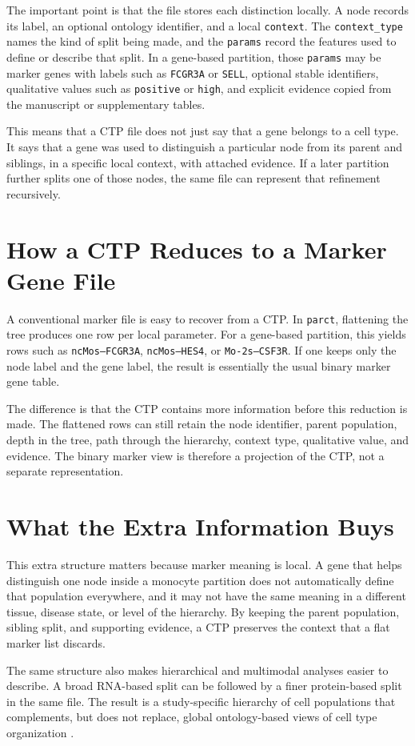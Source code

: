 \documentclass{article}
\begin{document}
The important point is that the file stores each distinction locally. A node records its label, an optional ontology identifier, and a local \texttt{context}. The \texttt{context\_type} names the kind of split being made, and the \texttt{params} record the features used to define or describe that split. In a gene-based partition, those \texttt{params} may be marker genes with labels such as \texttt{FCGR3A} or \texttt{SELL}, optional stable identifiers, qualitative values such as \texttt{positive} or \texttt{high}, and explicit evidence copied from the manuscript or supplementary tables.

This means that a CTP file does not just say that a gene belongs to a cell type. It says that a gene was used to distinguish a particular node from its parent and siblings, in a specific local context, with attached evidence. If a later partition further splits one of those nodes, the same file can represent that refinement recursively.

\section{How a CTP Reduces to a Marker Gene File}
A conventional marker file is easy to recover from a CTP. In \texttt{parct}, flattening the tree produces one row per local parameter. For a gene-based partition, this yields rows such as \texttt{ncMos--FCGR3A}, \texttt{ncMos--HES4}, or \texttt{Mo-2s--CSF3R}. If one keeps only the node label and the gene label, the result is essentially the usual binary marker gene table.

The difference is that the CTP contains more information before this reduction is made. The flattened rows can still retain the node identifier, parent population, depth in the tree, path through the hierarchy, context type, qualitative value, and evidence. The binary marker view is therefore a projection of the CTP, not a separate representation.

\section{What the Extra Information Buys}
This extra structure matters because marker meaning is local. A gene that helps distinguish one node inside a monocyte partition does not automatically define that population everywhere, and it may not have the same meaning in a different tissue, disease state, or level of the hierarchy. By keeping the parent population, sibling split, and supporting evidence, a CTP preserves the context that a flat marker list discards.

The same structure also makes hierarchical and multimodal analyses easier to describe. A broad RNA-based split can be followed by a finer protein-based split in the same file. The result is a study-specific hierarchy of cell populations that complements, but does not replace, global ontology-based views of cell type organization \citep{di_Montesano_2025}.

\newpage


\end{document}
